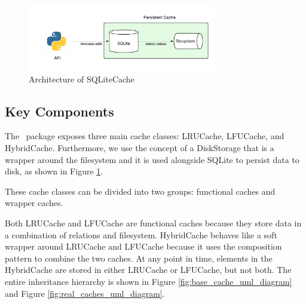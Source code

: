 \documentclass[11pt, journal]{IEEEtran}
\begin{document}
\begin{figure}[ht]
    \centering
    \includegraphics[width=3.25in]{images/overall_architecture.png}
    \caption{Architecture of SQLiteCache}
    \label{fig:architecture}
\end{figure}

\subsection{Key Components}
The \sqlitecache~package exposes three main cache classes: LRUCache, LFUCache, and HybridCache.
Furthermore, we use the concept of a DiskStorage that is a wrapper around the filesystem
and it is used alongside SQLite to persist data to disk, as shown in Figure \ref{fig:architecture}.

These cache classes can be divided into two groups: functional caches and wrapper caches.

Both LRUCache and LFUCache are functional caches because they store data
in a combination of relations and filesystem.
HybridCache behaves like a soft wrapper around LRUCache and LFUCache because
it uses the composition pattern to combine the two caches. At any point in time,
elements in the HybridCache are stored in either LRUCache or LFUCache, but not both.
The entire inheritance hierarchy is shown in Figure \ref{fig:base_cache_uml_diagram}
and Figure \ref{fig:real_caches_uml_diagram}.
\end{document}

